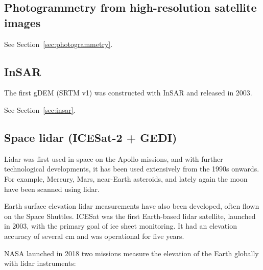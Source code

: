 \subsection{Photogrammetry from high-resolution satellite images}

See Section~\ref{sec:photogrammetry}.


\subsection{InSAR}

The first gDEM (SRTM v1) was constructed with InSAR and released in 2003. 

See Section~\ref{sec:insar}.


\subsection{Space lidar (ICESat-2 + GEDI)}

Lidar was first used in space on the Apollo missions, and with further technological developments, it has been used extensively from the 1990s onwards.
For example, Mercury, Mars, near-Earth asteroids, and lately again the moon have been scanned using lidar.

%

Earth surface elevation lidar measurements have also been developed, often flown on the Space Shuttles.
ICESat was the first Earth-based lidar satellite, launched in 2003, with the primary goal of ice sheet monitoring.
It had an elevation accuracy of several cm and was operational for five years.

%

NASA launched in 2018 two missions measure the elevation of the Earth globally with lidar instruments: 


